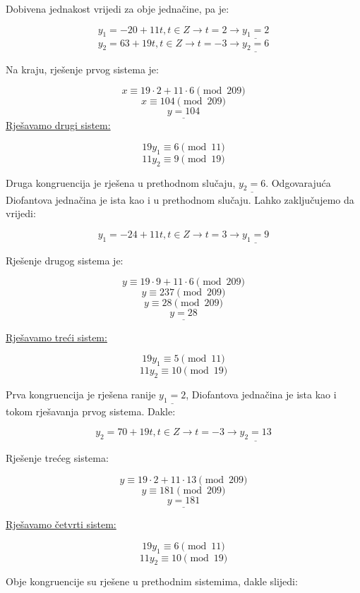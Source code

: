 \documentclass[12pt]{article}
\begin{document}
Dobivena jednakost vrijedi za obje jednačine, pa je:

$$y_{1} = -20 + 11t, t \in Z \to t = 2 \to \underline{y_{1} = 2}$$
$$y_{2} = 63 + 19t, t \in Z \to t = -3 \to \underline{y_{2} = 6}$$\vspace{1mm}

Na kraju, rješenje prvog sistema je:

$$x \equiv 19 \cdot 2 + 11 \cdot 6 \pmod{209}$$
$$x \equiv 104 \pmod{209}$$
$$\underline{y = 104}$$\vspace{1mm}
\newpage
\underline{Rješavamo drugi sistem:}

$$19y_{1} \equiv 6 \pmod{11}$$
$$11y_{2} \equiv 9 \pmod{19}$$\vspace{1mm}

Druga kongruencija je rješena u prethodnom slučaju, $\underline{y_{2} = 6}$. Odgovarajuća Diofantova jednačina je ista kao i u prethodnom slučaju. Lahko zaključujemo da vrijedi:

$$y_{1} = -24 + 11t, t \in Z \to t = 3 \to \underline{y_{1} = 9}$$\vspace{1mm}

Rješenje drugog sistema je:

$$y \equiv 19 \cdot 9 + 11 \cdot 6 \pmod{209}$$
$$y \equiv 237 \pmod{209}$$
$$y \equiv 28 \pmod{209}$$
$$\underline{y = 28}$$\vspace{1mm}

\underline{Rješavamo treći sistem:}

$$19y_{1} \equiv 5 \pmod{11}$$
$$11y_{2} \equiv 10 \pmod{19}$$\vspace{1mm}

Prva kongruencija je rješena ranije $\underline{y_{1} = 2}$, Diofantova jednačina je ista kao i tokom rješavanja prvog sistema. Dakle:

$$y_{2} = 70 + 19t, t \in Z \to t = -3 \to \underline{y_{2} = 13}$$\vspace{1mm}

Rješenje trećeg sistema:

$$y \equiv 19 \cdot 2 + 11 \cdot 13 \pmod{209}$$
$$y \equiv 181 \pmod{209}$$
$$\underline{y = 181}$$\vspace{1mm}

\underline{Rješavamo četvrti sistem:}

$$19y_{1} \equiv 6 \pmod{11}$$
$$11y_{2} \equiv 10 \pmod{19}$$\vspace{1mm}

Obje kongruencije su rješene u prethodnim sistemima, dakle slijedi:
\end{document}
